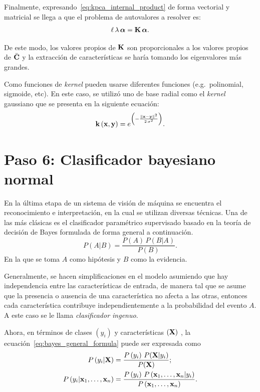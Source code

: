 Finalmente, expresando~\eqref{eq:kpca_internal_product} de forma vectorial y matricial se llega a que el problema de autovalores a resolver es:
%
\begin{equation}
    \ell\,\lambda\,\boldsymbol{\alpha} = \mathrm{\mathbf{K}}\,\boldsymbol{\alpha}.
\end{equation}

De este modo, los valores propios de $\mathrm{\mathbf{K}}$ son proporcionales a los valores propios de $\bar{\mathrm{\mathbf{C}}}$ y la extracción de características se haría tomando los eigenvalores más grandes.

Como funciones de \emph{kernel} pueden usarse diferentes funciones (e.g.\ polinomial, sigmoide, etc).
En este caso, se utilizó uno de base radial como el \emph{kernel} gaussiano que se presenta en la siguiente ecuación:
%
\begin{equation}
    \label{eq:kpca_gaussian}
    \vect{k}\left(\vect{x}, \vect{y}\right) = e^{\left(-\frac{\|\vect{x} - \vect{y}\|^2}{2\,\sigma^2}\right)}.
\end{equation}

\section*{Paso 6: Clasificador bayesiano normal}
\label{sec:nb_classifier}
En la última etapa de un sistema de visión de máquina se encuentra el reconocimiento e interpretación, en la cual se utilizan diversas técnicas.
Una de las más clásicas es el clasificador paramétrico supervisado basado en la teoría de decisión de Bayes formulada de forma general a continuación.
%
\begin{equation}
    \label{eq:bayes_general_formula}
    P(A|B) = \frac{P(A)\,P(B|A)}{P(B)}.
\end{equation}
%
En la que se toma $A$ como hipótesis y $B$ como la evidencia.

Generalmente, se hacen simplificaciones en el modelo asumiendo que hay independencia entre las características de entrada, de manera tal que se asume que la presencia o ausencia de una característica no afecta a las otras, entonces cada característica contribuye independientemente a la probabilidad del evento $A$.
A este caso se le llama \emph{clasificador ingenuo}.

Ahora, en términos de clases $\left(y_i\right)$ y características $\left(\mathrm{\mathbf{X}}\right)$ , la ecuación~\eqref{eq:bayes_general_formula} puede ser expresada como
%
\begin{subequations}
    \begin{align}
        P\left(y_i|\vect{X}\right) &= \frac{P\left(y_i\right)\,P(\vect{X}|y_i)}{P(\vect{X})}; \\
        P\left(y_i | \vect{x}_1, \dots, \vect{x}_n\right) &=
        \frac{P\left(y_i\right)\,P\left(\vect{x}_1, \dots, \vect{x}_n | y_i\right)}
        {P\left(\vect{x}_1, \dots, \vect{x}_n\right)}. \label{eq:bayes_features_formula}
    \end{align}
\end{subequations}

